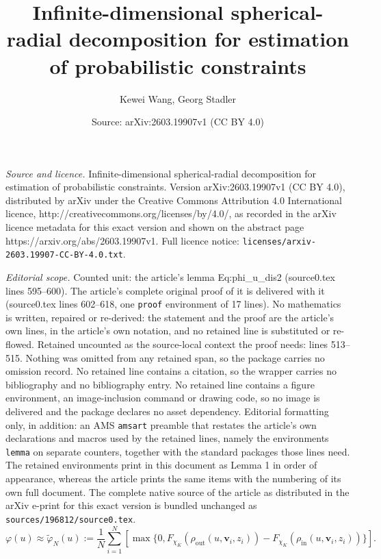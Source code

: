 \documentclass[10pt,a4paper]{amsart}
\title{Infinite-dimensional spherical-radial decomposition for estimation of probabilistic constraints}
\author{Kewei Wang, Georg Stadler}
\date{Source: arXiv:2603.19907v1 (CC BY 4.0)}
\begin{document}
\maketitle

\noindent\emph{Source and licence.} Infinite-dimensional spherical-radial decomposition for estimation of probabilistic constraints. Version arXiv:2603.19907v1 (CC BY 4.0), distributed by arXiv under the Creative Commons Attribution 4.0 International licence, http://creativecommons.org/licenses/by/4.0/, as recorded in the arXiv licence metadata for this exact version and shown on the abstract page https://arxiv.org/abs/2603.19907v1. Full licence notice: \texttt{licenses/arxiv-2603.19907-CC-BY-4.0.txt}.\par\smallskip

\noindent\textit{Editorial scope.} Counted unit: the article's lemma Eq:phi\_u\_dis2 (source0.tex lines 595--600). The article's complete original proof of it is delivered with it (source0.tex lines 602--618, one \texttt{proof} environment of 17 lines). No mathematics is written, repaired or re-derived: the statement and the proof are the article's own lines, in the article's own notation, and no retained line is substituted or re-flowed.  Retained uncounted as the source-local context the proof needs: lines 513--515.  Nothing was omitted from any retained span, so the package carries no omission record.  No retained line contains a citation, so the wrapper carries no bibliography and no bibliography entry.  No retained line contains a figure environment, an image-inclusion command or drawing code, so no image is delivered and the package declares no asset dependency.  Editorial formatting only, in addition: an AMS \texttt{amsart} preamble that restates the article's own declarations and macros used by the retained lines, namely the environments \texttt{lemma} on separate counters, together with the standard packages those lines need.  The retained environments print in this document as Lemma 1 in order of appearance, whereas the article prints the same items with the numbering of its own full document.  The complete native source of the article as distributed in the arXiv e-print for this exact version is bundled unchanged as \texttt{sources/196812/source0.tex}.
\begin{equation}\label{Eq:phi_u_dis}
    \varphi(u)\approx \tilde{\varphi}_N(u):=\frac{1}{N}\sum_{i=1}^N \left[ \max{\{0, F_{\chi_K}(\rho_{\mathrm{out}}(u,\boldsymbol{v}_i,z_i))-F_{\chi_K}(\rho_{\mathrm{in}}(u,\boldsymbol{v}_i,z_i))\}} \right].
\end{equation}
\end{document}

